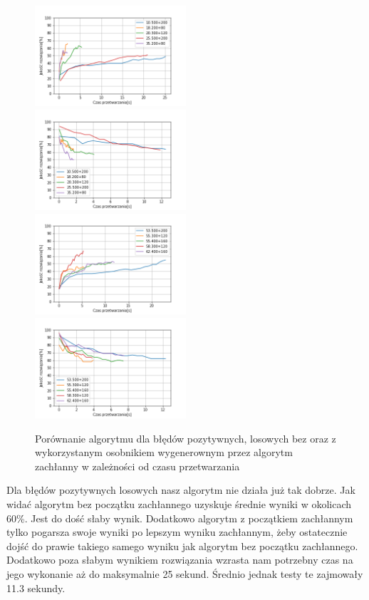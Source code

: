 \documentclass{article}
\begin{document}
\begin{figure}[H]
\includegraphics[width=0.5\textwidth]{Czaspoz-los1.png}
\includegraphics[width=0.5\textwidth]{Czaspoz-los-greedy1.png}
\includegraphics[width=0.5\textwidth]{Czaspoz-los2.png}
\includegraphics[width=0.5\textwidth]{Czaspoz-los-greedy2.png}
\caption{Porównanie algorytmu dla błędów pozytywnych, losowych bez oraz z wykorzystanym osobnikiem wygenerownym przez algorytm zachłanny w zależności od czasu przetwarzania}
\end{figure}
Dla błędów pozytywnych losowych nasz algorytm nie działa już tak dobrze. Jak widać algorytm bez początku zachłannego uzyskuje średnie wyniki w okolicach 60\%. Jest do dość słaby wynik. Dodatkowo algorytm z początkiem zachłannym tylko pogarsza swoje wyniki po lepszym wyniku zachłannym, żeby ostatecznie dojść do prawie takiego samego wyniku jak algorytm bez początku zachłannego. \\Dodatkowo poza słabym wynikiem rozwiązania wzrasta nam potrzebny czas na jego wykonanie aż do maksymalnie 25 sekund. Średnio jednak testy te zajmowały 11.3 sekundy.
\end{document}
